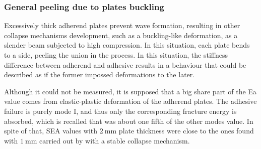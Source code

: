\documentclass[
documentsize = a4, %
font = cmr, %
typesize = 11, %
printmode = true,
onehalfspacing = true,
language = en, %
titlepage = udciccp, %
degree = pt, %
dedication = true,
acknowledgements = true,
abstract-en = true,
abstract-es = false,
abstract-ga = false,
epigraphs = true,
toc = true,
lof = true,
lot = true,
frontmatterintoc = false,
notation = false,
minimal = false,
]{UDCthesis}
\begin{document}
\subsubsection{General peeling due to plates buckling}

Excessively thick adherend plates prevent wave formation, resulting in other collapse mechanisms development, such as a buckling-like deformation, as a slender beam subjected to high compression. In this situation, each plate bends to a side, peeling the union in the process. In this situation, the stiffness difference between adherend and adhesive results in a behaviour that could be described as if the former impossed deformations to the later.

Although it could not be measured, it is supposed that a big share part of the \gls{Ea} value comes from elastic-plastic deformation of the adherend plates. The adhesive failure is purely mode I, and thus only the corresponding fracture energy is absorbed, which is recalled that was about one fifth of the other modes value. In spite of that, \gls{SEA} values with $\SI{2}{\mm}$ plate thickness were close to the ones found with $\SI{1}{\mm}$ carried out by \citet{Peroni2009} with a stable collapse mechanism.
\end{document}
